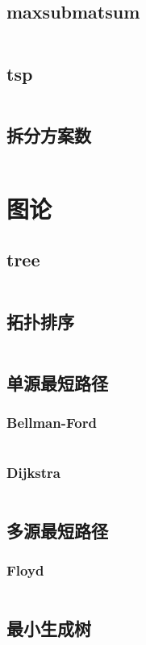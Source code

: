 \documentclass[a4paper,11pt]{article}
\begin{document}
\subsection{maxsubmatsum}
\inputminted[breaklines]{c++}{dp/max_sub_mat_sum.cpp}
\subsection{tsp}
\inputminted[breaklines]{c++}{dp/tsp.cpp}
\subsection{拆分方案数}
\inputminted[breaklines]{c++}{dp/split_scheme.cpp}

\section{图论}
\subsection{tree}
\inputminted[breaklines]{c++}{graph/tree.h}
\subsection{拓扑排序}
\inputminted[breaklines]{c++}{graph/topoord.cpp}
\subsection{单源最短路径}
\subsubsection{Bellman-Ford}
\inputminted[breaklines]{c++}{graph/bellman.cpp}
\subsubsection{Dijkstra}
\inputminted[breaklines]{c++}{graph/dijkstra.cpp}

\subsection{多源最短路径}
\subsubsection{Floyd}
\inputminted[breaklines]{c++}{graph/floyd.cpp}

\subsection{最小生成树} 
\end{document}
